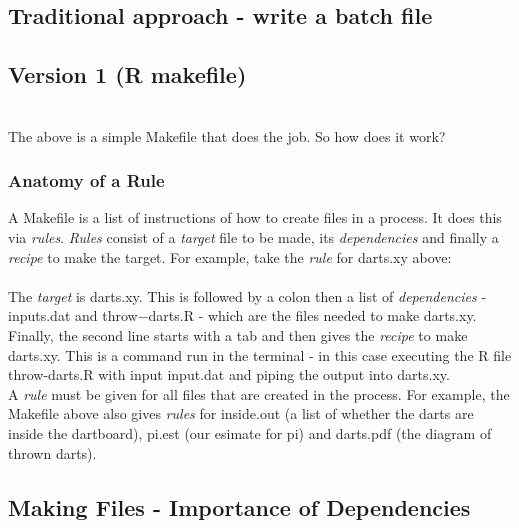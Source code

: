\documentclass[12pt]{article}\usepackage[]{graphicx}\usepackage[]{color}
\begin{document}
\subsection{Traditional approach - write a batch file}



\lstset{language=sh}
\fbox{}

\subsection{Version 1 (R makefile)}


\fbox{}\\

The above is a simple Makefile that does the job. So how does it work?\\

\subsubsection{Anatomy of a Rule}

A Makefile is a list of instructions of how to create files in a process. It does this via \emph{rules}. \emph{Rules} consist of a \emph{target} file to be made, its \emph{dependencies} and finally a \emph{recipe} to make the target. For example, take the \emph{rule} for darts.xy above:\\
\fbox{}\\

The \emph{target} is darts.xy. This is followed by a colon then a list of \emph{dependencies} - inputs.dat and throw−darts.R - which are the files needed to make darts.xy. Finally, the second line starts with a tab and then gives the \emph{recipe} to make darts.xy. This is a command run in the terminal - in this case executing the R file throw-darts.R with input input.dat and piping the output into darts.xy.\\

A \emph{rule} must be given for all files that are created in the process. For example, the Makefile above also gives \emph{rules} for inside.out (a list of whether the darts are inside the dartboard), pi.est (our esimate for pi) and darts.pdf (the diagram of thrown darts).

\subsection{Making Files - Importance of Dependencies}
\end{document}
